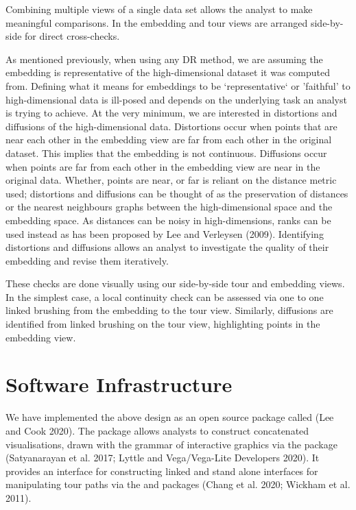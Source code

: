 \documentclass[article,notitle]{jdssv}
\begin{document}
Combining multiple views of a single data set allows the analyst
to make meaningful comparisons. In  the embedding
and tour views are arranged side-by-side for direct cross-checks.

As mentioned previously, when using any DR method, we are assuming the
embedding is representative of the high-dimensional dataset it was computed
from. Defining what it means for embeddings to be `representative` or 'faithful'
to high-dimensional data is ill-posed and depends on the underlying task an
analyst is trying to achieve. At the very minimum, we are interested in
distortions and diffusions of the high-dimensional data. Distortions occur when
points that are near each other in the embedding view are far from each other
in the original dataset. This implies that the embedding is not continuous.
Diffusions occur when points are far from each other in the embedding view are
near in the original data. Whether, points are near, or far is reliant on the
distance metric used; distortions and diffusions can be thought of as the
preservation of distances or the nearest neighbours graphs between the
high-dimensional space and the embedding space. As distances can be noisy in
high-dimensions, ranks can be used instead as has been proposed by Lee and Verleysen (2009).
Identifying distortions and diffusions allows an analyst to investigate the
quality of their embedding and revise them iteratively.

These checks are done visually using our side-by-side tour and embedding views.
In the simplest case, a local continuity check can be assessed via one to
one linked brushing from the embedding to the tour view. Similarly, diffusions
are identified from linked brushing on the tour view, highlighting points
in the embedding view.

\hypertarget{software-infrastructure}{%
\section{Software Infrastructure}\label{software-infrastructure}}

We have implemented the above design as an open source  package called
 (Lee and Cook 2020). The package allows analysts to construct concatenated
visualisations, drawn with the  grammar of interactive graphics via
the  package (Satyanarayan et al. 2017; Lyttle and Vega/Vega-Lite Developers 2020). It provides
an interface for constructing linked and stand alone interfaces for
manipulating tour paths via the  and  packages
(Chang et al. 2020; Wickham et al. 2011).
\end{document}
